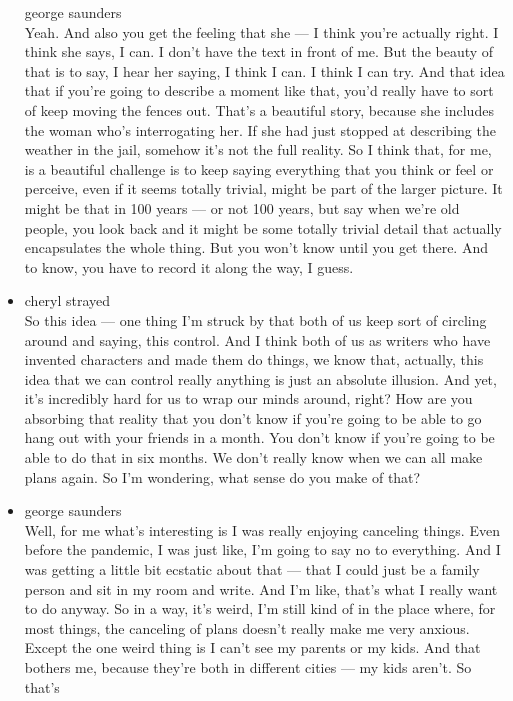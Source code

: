 \begin{itemize}
  george saunders\\
  Yeah. And also you get the feeling that she --- I think you're
  actually right. I think she says, I can. I don't have the text in
  front of me. But the beauty of that is to say, I hear her saying, I
  think I can. I think I can try. And that idea that if you're going to
  describe a moment like that, you'd really have to sort of keep moving
  the fences out. That's a beautiful story, because she includes the
  woman who's interrogating her. If she had just stopped at describing
  the weather in the jail, somehow it's not the full reality. So I think
  that, for me, is a beautiful challenge is to keep saying everything
  that you think or feel or perceive, even if it seems totally trivial,
  might be part of the larger picture. It might be that in 100 years ---
  or not 100 years, but say when we're old people, you look back and it
  might be some totally trivial detail that actually encapsulates the
  whole thing. But you won't know until you get there. And to know, you
  have to record it along the way, I guess.
\item
  cheryl strayed\\
  So this idea --- one thing I'm struck by that both of us keep sort of
  circling around and saying, this control. And I think both of us as
  writers who have invented characters and made them do things, we know
  that, actually, this idea that we can control really anything is just
  an absolute illusion. And yet, it's incredibly hard for us to wrap our
  minds around, right? How are you absorbing that reality that you don't
  know if you're going to be able to go hang out with your friends in a
  month. You don't know if you're going to be able to do that in six
  months. We don't really know when we can all make plans again. So I'm
  wondering, what sense do you make of that?
\item
  george saunders\\
  Well, for me what's interesting is I was really enjoying canceling
  things. Even before the pandemic, I was just like, I'm going to say no
  to everything. And I was getting a little bit ecstatic about that ---
  that I could just be a family person and sit in my room and write. And
  I'm like, that's what I really want to do anyway. So in a way, it's
  weird, I'm still kind of in the place where, for most things, the
  canceling of plans doesn't really make me very anxious. Except the one
  weird thing is I can't see my parents or my kids. And that bothers me,
  because they're both in different cities --- my kids aren't. So that's

\end{itemize}
